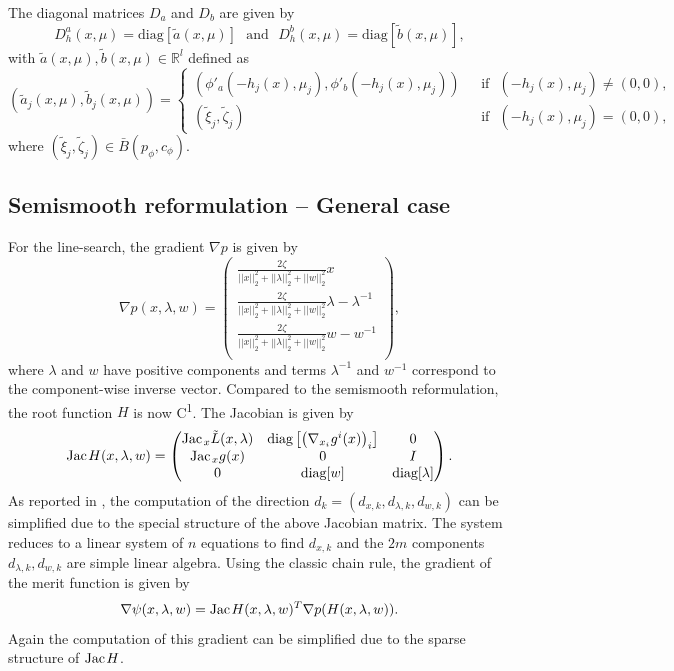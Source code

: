 \documentclass[11pt]{article}
\newcommand{\txtm}[1]{\textrm{~~#1~~}}
\newcommand{\expo}{\textsuperscript}
\newcommand{\diag}{\textrm{diag}}
\newcommand{\Jac}{\textrm{Jac\hskip+.1em}}
\newcommand{\R}{\ensuremath{\mathbb{R}}}
\begin{document}
The diagonal matrices $D_a$ and $D_b$ are given by
$$
D_h^a(x, \mu) = \diag[ \tilde a(x, \mu) ]
\txtm{and}
D_h^b(x, \mu) = \diag[ \tilde b(x, \mu) ],
$$
with $\tilde a(x, \mu), \tilde b(x, \mu) \in \R^{l}$  defined as
$$
( \tilde a_j(x, \mu) , \tilde b_j(x, \mu) ) = 
\left\{
\begin{array}{cl} %
\left(  \phi'_a( -h_j(x), \mu_j ), \phi'_b ( -h_j(x), \mu_j ) \right) 
& \txtm{if} ( -h_j(x), \mu_j ) \neq (0, 0), \\
  (\tilde \xi_{j} ,\tilde \zeta_{j} )
& \txtm{if} ( -h_j(x), \mu_j ) = (0, 0), 
\end{array}
\right.
$$
where $(\tilde \xi_{j} , \tilde \zeta_{j} ) \in \bar B(p_\phi, c_\phi)$. 



\subsection{Semismooth reformulation -- General case\label{app:ceq:gencase}}


For the line-search, the gradient $\nabla p$  is given by
$$
\nabla p(x, \lambda, w)=
\left( \begin{matrix}
 \frac{2 \zeta }{ ||x||_2^2 + ||\lambda ||_2^2+ ||w||_2^2 } x \\
 \frac{2 \zeta }{ ||x||_2^2 + ||\lambda ||_2^2+ ||w||_2^2 } \lambda  - \lambda^{-1} \\
 \frac{2 \zeta }{ ||x||_2^2 + ||\lambda ||_2^2+ ||w||_2^2 } w  - w^{-1} \\
\end{matrix}
\right),
$$
where  $\lambda$ and $w$ have positive components and  terms $\lambda^{-1}$ and $w^{-1}$ correspond to the component-wise inverse vector.
Compared to the semismooth reformulation, the root function $H$ is now C\expo{1}. 
The Jacobian is given by 
$$
\Jac H(x, \lambda, w) = 
\left( 
\begin{matrix}
\Jac_x \tilde L(x, \lambda)  &  \diag\left[ \left( \nabla_{x_i} g^i(x) \right)_i \right]  & 0 \\
\Jac_x g(x) & 0 & I \\
0 & \diag[w] & \diag[\lambda]
\end{matrix}
\right).
$$
As reported in \cite{kanzowfacchetal11}, the computation of the direction $d_k = (d_{x, k}, d_{\lambda, k}, d_{w, k})$ can be simplified due to the special structure of the above Jacobian matrix. 
The system reduces to a linear system of $n$ equations to find $d_{x, k}$ and the $2m$ components $d_{\lambda, k}, d_{w, k}$ are simple linear algebra.
Using the classic chain rule, the gradient of the merit function is given by 
$$
\nabla \psi(x, \lambda, w) = \Jac H(x, \lambda, w)^T \nabla p(H(x, \lambda, w)).
$$
Again the computation of this gradient can be simplified due to the sparse structure of $\Jac H$.
\end{document}
